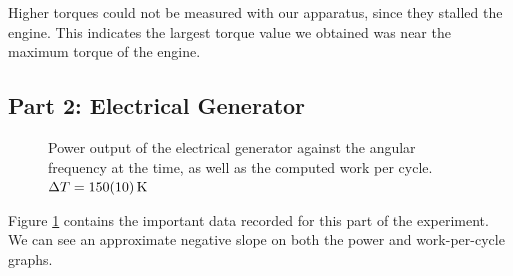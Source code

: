 \documentclass[a4paper]{scrartcl}
\begin{document}
Higher torques could not be measured with our apparatus, since they stalled the engine. This indicates the largest torque value we obtained was near the maximum torque of the engine.

\subsection{Part 2: Electrical Generator}
\begin{figure}
    \centering
    \caption{Power output of the electrical generator against the angular frequency at the time, as well as the computed work per cycle. \(\Delta T = \SI{150 \pm 10}{\kelvin}\)}
    \label{fig:part2}
\end{figure}

Figure \ref{fig:part2} contains the important data recorded for this part of the experiment. We can see an approximate negative slope on both the power and work-per-cycle graphs.
\end{document}
